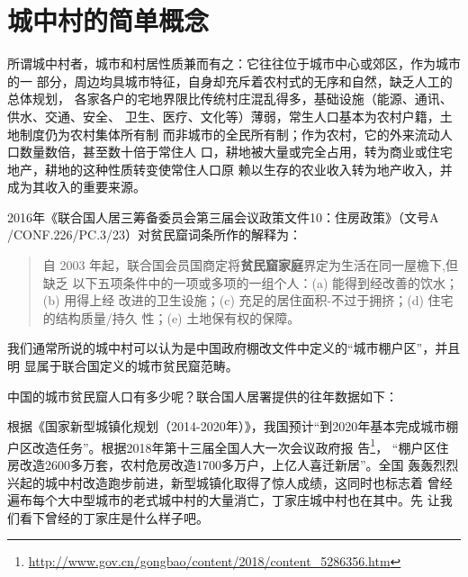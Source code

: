 \chapter{城中村的简单概念}

所谓城中村者，城市和村居性质兼而有之：它往往位于城市中心或郊区，作为城市的一
部分，周边均具城市特征，自身却充斥着农村式的无序和自然，缺乏人工的总体规划，
各家各户的宅地界限比传统村庄混乱得多，基础设施（能源、通讯、供水、交通、安全、
卫生、医疗、文化等）薄弱，常生人口基本为农村户籍，土地制度仍为农村集体所有制
而非城市的全民所有制；作为农村，它的外来流动人口数量数倍，甚至数十倍于常住人
口，耕地被大量或完全占用，转为商业或住宅地产，耕地的这种性质转变使常住人口原
赖以生存的农业收入转为地产收入，并成为其收入的重要来源。

2016年《联合国人居三筹备委员会第三届会议政策文件10：住房政策》（文号A
/CONF.226/PC.3/23）对贫民窟词条所作的解释为：
\begin{quotation}
  自 2003 年起，联合国会员国商定将\textbf{贫民窟家庭}界定为生活在同一屋檐下,但缺乏
  以下五项条件中的一项或多项的一组个人：(a) 能得到经改善的饮水；(b) 用得上经
  改进的卫生设施；(c) 充足的居住面积-不过于拥挤；(d) 住宅的结构质量/持久
  性；(e) 土地保有权的保障。
\end{quotation}

我们通常所说的城中村可以认为是中国政府棚改文件中定义的“城市棚户区”，并且明
显属于联合国定义的城市贫民窟范畴。\cite{unandchina}


中国的城市贫民窟人口有多少呢？联合国人居署提供的往年数据如下：
\begin{table}[!ht] \centering
\label{my-label}%
  \caption{1990-2014年中国城市贫民窟人口比例及数量}
  \end{table}

  根据《国家新型城镇化规划（2014-2020年）》，我国预计“到2020年基本完成城市棚
  户区改造任务”。根据2018年第十三届全国人大一次会议政府报
  告\footnote{\url{http://www.gov.cn/gongbao/content/2018/content_5286356.htm}}，
  “棚户区住房改造2600多万套，农村危房改造1700多万户，上亿人喜迁新居”。全国
  轰轰烈烈兴起的城中村改造跑步前进，新型城镇化取得了惊人成绩，这同时也标志着
  曾经遍布每个大中型城市的老式城中村的大量消亡，丁家庄城中村也在其中。先
  让我们看下曾经的丁家庄是什么样子吧。

